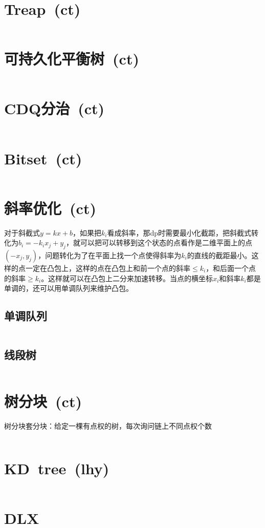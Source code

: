 \section{Treap\ \small(ct)}
	\inputminted{cpp}{DataStructure/treap.cpp}
\section{可持久化平衡树\ \small(ct)}
	\inputminted{cpp}{DataStructure/functional_treap.cpp}
\section{CDQ分治\ \small(ct)}
	\inputminted{cpp}{DataStructure/cdq_divide.cpp}
\section{Bitset\ \small(ct)}
	\inputminted{cpp}{DataStructure/bitset.cpp}
\section{斜率优化\ \small(ct)}
	对于斜截式$ y = k x + b $，如果把$ k_i $看成斜率，那dp时需要最小化截距，把斜截式转化为$ b_i = - k_i x_j + y_j $，就可以把可以转移到这个状态的点看作是二维平面上的点$ (- x_j, y_j) $，问题转化为了在平面上找一个点使得斜率为$ k_i $的直线的截距最小。这样的点一定在凸包上，这样的点在凸包上和前一个点的斜率$ \leq k_i$，和后面一个点的斜率$ \geq k_i $。这样就可以在凸包上二分来加速转移。当点的横坐标$ x_i $和斜率$ k_i $都是单调的，还可以用单调队列来维护凸包。
	\subsection*{单调队列}
		\inputminted{cpp}{DataStructure/slope_optimize_queue.cpp}
	\subsection*{线段树}
		\inputminted{cpp}{DataStructure/slope_optimize_segment.cpp}
\section{树分块\ \small(ct)}
	树分块套分块：给定一棵有点权的树，每次询问链上不同点权个数
	\inputminted{cpp}{DataStructure/tree_block.cpp}
\section{KD\ tree\ \small(lhy)}
	\inputminted{cpp}{DataStructure/kd_tree.cpp}
\section{DLX}
